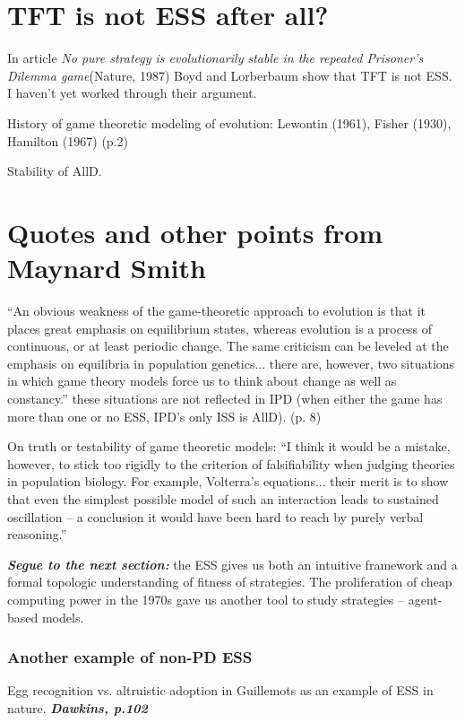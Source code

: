 \section{TFT is not ESS after all?}
In article \textit{No pure strategy is evolutionarily stable in the repeated Prisoner's Dilemma game}(Nature, 1987) Boyd and Lorberbaum show that TFT is not ESS. I haven't yet worked through their argument.


History of game theoretic modeling of evolution: Lewontin (1961), Fisher (1930), Hamilton (1967) (p.2)

Stability of AllD.

\section{Quotes and other points from Maynard Smith}
``An obvious weakness of the game-theoretic approach to evolution is that it places great emphasis on equilibrium states, whereas evolution is a process of continuous, or at least periodic change. The same criticism can be leveled at the emphasis on equilibria in population genetics... there are, however, two situations in which game theory models force us to think about change as well as constancy.'' these situations are not reflected in IPD (when either the game has more than one or no ESS, IPD's only ISS is AllD). (p. 8)

On truth or testability of game theoretic models: ``I think it would be a mistake, however, to stick too rigidly to the criterion of falsifiability when judging theories in population biology. For example, Volterra's equations... their merit is to show that even the simplest possible model of such an interaction leads to sustained oscillation -- a conclusion it would have been hard to reach by purely verbal reasoning.''

\textit{\textbf{Segue to the next section:}} the ESS gives us both an intuitive framework and a formal topologic understanding of fitness of strategies. The proliferation of cheap computing power in the 1970s gave us another tool to study strategies -- agent-based models.

\subsubsection{Another example of non-PD ESS}
Egg recognition vs. altruistic adoption in Guillemots as an example of ESS in nature. \textit{\textbf{Dawkins, p.102}}



